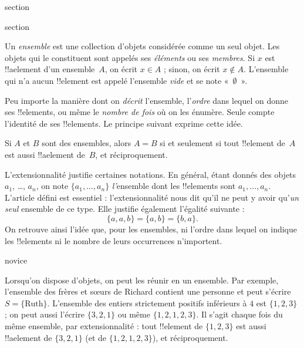 \documentclass[11pt,a4paper,openany]{memoir}
\begin{document}
\begingroup
\expandafter\def\csname ol@sectioncs\endcsname{section}
\def\olfilename{sets}




\begingroup
\expandafter\def\csname ol@sectioncs\endcsname{section}
\def\olfilename{basics}



Un \emph{ensemble} est une collection d'objets considérée comme un seul
objet. Les objets qui le constituent sont appelés ses \emph{éléments}
ou ses \emph{membres}. Si $x$ est !!a{element} d'un ensemble~$A$,
on écrit $x \in A$ ; sinon, on écrit $x \notin A$. L'ensemble qui n'a
aucun !!{element} est appelé l'ensemble \emph{vide} et se note
«~$\emptyset$~».

\begin{explain}
Peu importe la manière dont on \emph{décrit} l'ensemble,
l'\emph{ordre} dans lequel on donne ses !!{element}s, ou même le
\emph{nombre de fois} où on les énumère. Seule compte l'identité
de ses !!{element}s. Le principe suivant exprime cette idée.
\end{explain}

\begin{defn}[Extensionnalité]
  Si $A$ et $B$ sont des ensembles, alors $A = B$ si et seulement si
  tout !!{element} de~$A$ est aussi !!a{element} de~$B$, et
  réciproquement.
\end{defn}

L'extensionnalité justifie certaines notations. En général, étant donnés
des objets $a_{1}$, \dots, $a_{n}$, on note $\{a_{1}, \dots, a_{n}\}$
\emph{l'}ensemble dont les !!{element}s sont $a_1, \ldots, a_n$.
L'article défini est essentiel : l'extensionnalité nous dit qu'il ne
peut y avoir qu'\emph{un seul} ensemble de ce type. Elle justifie
également l'égalité suivante :
  \[
    \{a, a, b\} = \{a, b\} = \{b,a\}.
  \]
On retrouve ainsi l'idée que, pour les ensembles, ni l'ordre dans
lequel on indique les !!{element}s ni le nombre de leurs occurrences
n'importent.

\begin{tagblock}{novice}
\begin{ex}
Lorsqu'on dispose d'objets, on peut les réunir en un ensemble.
Par exemple, l'ensemble des frères et sœurs de Richard contient
une personne et peut s'écrire $S=\{\textrm{Ruth}\}$.
L'ensemble des entiers strictement positifs inférieurs à $4$ est
$\{1, 2, 3\}$ ; on peut aussi l'écrire $\{3, 2, 1\}$ ou même
$\{1, 2, 1, 2, 3\}$. Il s'agit chaque fois du même ensemble,
par extensionnalité : tout !!{element} de $\{1, 2, 3\}$ est aussi
!!a{element} de $\{3, 2, 1\}$ (et de $\{1, 2, 1, 2, 3\}$), et
réciproquement.
\end{ex}
\end{tagblock}
\end{document}
